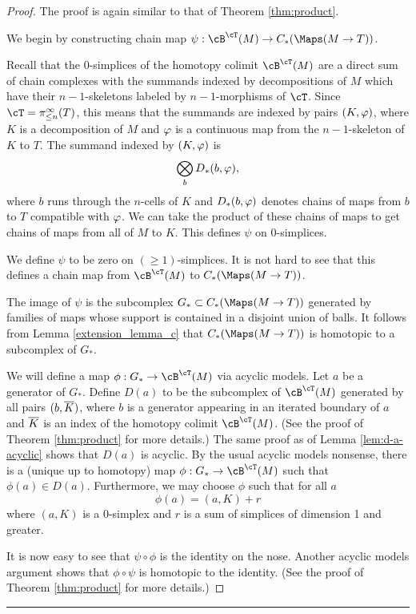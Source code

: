 \begin{proof}
The proof is again similar to that of Theorem \ref{thm:product}.

We begin by constructing chain map $\psi: \cB^\cT(M) \to C_*(\Maps(M\to T))$.

Recall that 
the 0-simplices of the homotopy colimit $\cB^\cT(M)$ 
are a direct sum of chain complexes with the summands indexed by
decompositions of $M$ which have their $n{-}1$-skeletons labeled by $n{-}1$-morphisms
of $\cT$.
Since $\cT = \pi^\infty_{\leq n}(T)$, this means that the summands are indexed by pairs
$(K, \varphi)$, where $K$ is a decomposition of $M$ and $\varphi$ is a continuous
map from the $n{-}1$-skeleton of $K$ to $T$.
The summand indexed by $(K, \varphi)$ is
\[
	\bigotimes_b D_*(b, \varphi),
\]
where $b$ runs through the $n$-cells of $K$ and $D_*(b, \varphi)$ denotes
chains of maps from $b$ to $T$ compatible with $\varphi$.
We can take the product of these chains of maps to get chains of maps from
all of $M$ to $K$.
This defines $\psi$ on 0-simplices.

We define $\psi$ to be zero on $(\ge1)$-simplices.
It is not hard to see that this defines a chain map from 
$\cB^\cT(M)$ to $C_*(\Maps(M\to T))$.

The image of $\psi$ is the subcomplex $G_*\sub C_*(\Maps(M\to T))$ generated by 
families of maps whose support is contained in a disjoint union of balls.
It follows from Lemma \ref{extension_lemma_c} 
that $C_*(\Maps(M\to T))$ is homotopic to a subcomplex of $G_*$.

We will define a map $\phi:G_*\to \cB^\cT(M)$ via acyclic models.
Let $a$ be a generator of $G_*$.
Define $D(a)$ to be the subcomplex of $\cB^\cT(M)$ generated by all 
pairs $(b, \overline{K})$, where $b$ is a generator appearing in an iterated boundary of $a$
and $\overline{K}$ is an index of the homotopy colimit $\cB^\cT(M)$.
(See the proof of Theorem \ref{thm:product} for more details.)
The same proof as of Lemma \ref{lem:d-a-acyclic} shows that $D(a)$ is acyclic.
By the usual acyclic models nonsense, there is a (unique up to homotopy)
map $\phi:G_*\to \cB^\cT(M)$ such that $\phi(a)\in D(a)$.
Furthermore, we may choose $\phi$ such that for all $a$ 
\[
	\phi(a) = (a, K) + r
\]
where $(a, K)$ is a 0-simplex and $r$ is a sum of simplices of dimension 1 and greater.

It is now easy to see that $\psi\circ\phi$ is the identity on the nose.
Another acyclic models argument shows that $\phi\circ\psi$ is homotopic to the identity.
(See the proof of Theorem \ref{thm:product} for more details.)
\end{proof}


\medskip
\hrule
\medskip

\medskip
{}



